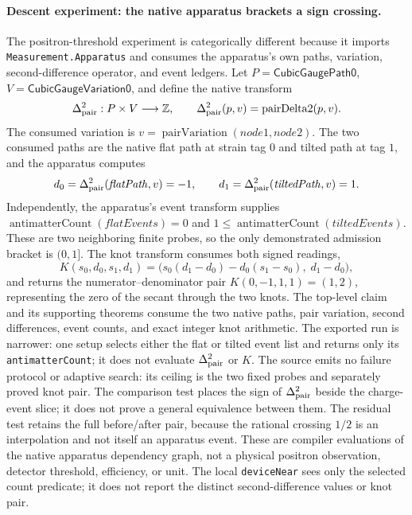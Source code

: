 \paragraph{Descent experiment: the native apparatus brackets a sign crossing.}
The positron-threshold experiment is categorically different because it imports \texttt{Measurement.Apparatus} and consumes the apparatus's own paths, variation, second-difference operator, and event ledgers.
Let \(P=\mathsf{CubicGaugePath0}\), \(V=\mathsf{CubicGaugeVariation0}\), and define the native transform
\[
 \Delta^2_{\rm pair}:P\times V\longrightarrow\mathbb Z,
 \qquad
 \Delta^2_{\rm pair}(p,v)=\operatorname{pairDelta2}(p,v).
\]
The consumed variation is \(v=\operatorname{pairVariation}(\mathit{node1},\mathit{node2})\).
The two consumed paths are the native flat path at strain tag \(0\) and tilted path at tag \(1\), and the apparatus computes
\[
 d_0=\Delta^2_{\rm pair}(\mathit{flatPath},v)=-1,
 \qquad
 d_1=\Delta^2_{\rm pair}(\mathit{tiltedPath},v)=1.
\]
Independently, the apparatus's event transform supplies \(\operatorname{antimatterCount}(\mathit{flatEvents})=0\) and \(1\le\operatorname{antimatterCount}(\mathit{tiltedEvents})\).
These are two neighboring finite probes, so the only demonstrated admission bracket is \((0,1]\).
The knot transform consumes both signed readings,
\[
 K(s_0,d_0,s_1,d_1)
 =\bigl(s_0(d_1-d_0)-d_0(s_1-s_0),\;d_1-d_0\bigr),
\]
and returns the numerator--denominator pair \(K(0,-1,1,1)=(1,2)\), representing the zero of the secant through the two knots.
The top-level claim and its supporting theorems consume the two native paths, pair variation, second differences, event counts, and exact integer knot arithmetic.
The exported run is narrower: one setup selects either the flat or tilted event list and returns only its \texttt{antimatterCount}; it does not evaluate \(\Delta^2_{\rm pair}\) or \(K\).
The source emits no failure protocol or adaptive search: its ceiling is the two fixed probes and separately proved
knot pair.
The comparison test places the sign of \(\Delta^2_{\rm pair}\) beside the charge-event slice; it does not prove a general equivalence between them.
The residual test retains the full before/after pair, because the rational crossing \(1/2\) is an interpolation and not itself an apparatus event.
These are compiler evaluations of the native apparatus dependency graph, not a physical positron observation,
detector threshold, efficiency, or unit.  The local \texttt{deviceNear} sees only the selected count predicate; it does
not report the distinct second-difference values or knot pair.

